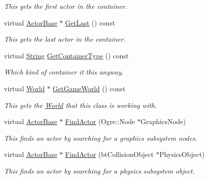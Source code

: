 \begin{DoxyCompactItemize}
\begin{DoxyCompactList}\small\item\em This gets the first actor in the container. \item\end{DoxyCompactList}\item 
virtual \hyperlink{classphys_1_1ActorBase}{ActorBase} $\ast$ \hyperlink{classphys_1_1ActorContainerVector_a211f6e419ef0b753cecf2c662a54511e}{GetLast} () const 
\begin{DoxyCompactList}\small\item\em This gets the last actor in the container. \item\end{DoxyCompactList}\item 
virtual \hyperlink{namespacephys_aa03900411993de7fbfec4789bc1d392e}{String} \hyperlink{classphys_1_1ActorContainerVector_ae18c29b30d840e0f4fc9b553dd5ca32c}{GetContainerType} () const 
\begin{DoxyCompactList}\small\item\em Which kind of container it this anyway. \item\end{DoxyCompactList}\item 
virtual \hyperlink{classphys_1_1World}{World} $\ast$ \hyperlink{classphys_1_1ActorContainerVector_a5519eb0000073a2f397e158bfc368349}{GetGameWorld} () const 
\begin{DoxyCompactList}\small\item\em This gets the \hyperlink{classphys_1_1World}{World} that this class is working with. \item\end{DoxyCompactList}\item 
virtual \hyperlink{classphys_1_1ActorBase}{ActorBase} $\ast$ \hyperlink{classphys_1_1ActorContainerVector_ad01cf1452bda36cee175ae0e54d509cc}{FindActor} (Ogre::Node $\ast$GraphicsNode)
\begin{DoxyCompactList}\small\item\em This finds an actor by searching for a graphics subsystem nodes. \item\end{DoxyCompactList}\item 
virtual \hyperlink{classphys_1_1ActorBase}{ActorBase} $\ast$ \hyperlink{classphys_1_1ActorContainerVector_a5ebcdeb3018f3baf92154ddec79cd054}{FindActor} (btCollisionObject $\ast$PhysicsObject)
\begin{DoxyCompactList}\small\item\em This finds an actor by searching for a physics subsystem object. \item\end{DoxyCompactList}\item 

\end{DoxyCompactItemize}

